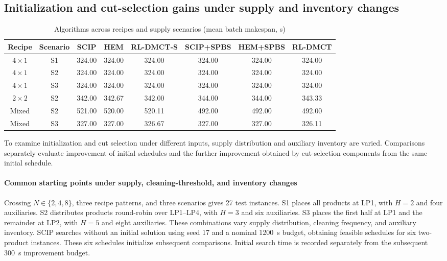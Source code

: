 \documentclass[final,5p,times,twocolumn]{elsarticle}
\begin{document}
\subsection{Initialization and cut-selection gains under supply and inventory changes}
\label{sec:journal-transfer-cn}


\begin{table}[!t]
\centering\small
\caption{Algorithms across recipes and supply scenarios (mean batch makespan, s)}
\label{tab:journal-transfer-cn}
\begin{tabular}{cccccccc}\toprule
Recipe & Scenario & SCIP & HEM & RL-DMCT-S & SCIP+SPBS & HEM+SPBS & RL-DMCT\\\midrule
$4\times1$ & S1 & 324.00 & 324.00 & 324.00 & 324.00 & 324.00 & 324.00\\
$4\times1$ & S2 & 324.00 & 324.00 & 324.00 & 324.00 & 324.00 & 324.00\\
$4\times1$ & S3 & 324.00 & 324.00 & 324.00 & 324.00 & 324.00 & 324.00\\
$2\times2$ & S2 & 342.00 & 342.67 & 342.00 & 344.00 & 344.00 & 343.33\\
Mixed & S2 & 521.00 & 520.00 & 520.11 & 492.00 & 492.00 & 492.00\\
Mixed & S3 & 327.00 & 327.00 & 326.67 & 327.00 & 327.00 & 326.11\\
\bottomrule\end{tabular}
\end{table}


To examine initialization and cut selection under different inputs, supply distribution and auxiliary inventory are varied. Comparisons separately evaluate improvement of initial schedules and the further improvement obtained by cut-selection components from the same initial schedule.

\paragraph{Common starting points under supply, cleaning-threshold, and inventory changes}
Crossing $N\in\{2,4,8\}$, three recipe patterns, and three scenarios gives 27 test instances. S1 places all products at LP1, with $H=2$ and four auxiliaries. S2 distributes products round-robin over LP1--LP4, with $H=3$ and six auxiliaries. S3 places the first half at LP1 and the remainder at LP2, with $H=5$ and eight auxiliaries. These combinations vary supply distribution, cleaning frequency, and auxiliary inventory. SCIP searches without an initial solution using seed 17 and a nominal 1200~s budget, obtaining feasible schedules for six two-product instances. These six schedules initialize subsequent comparisons. Initial search time is recorded separately from the subsequent 300~s improvement budget.
\end{document}
